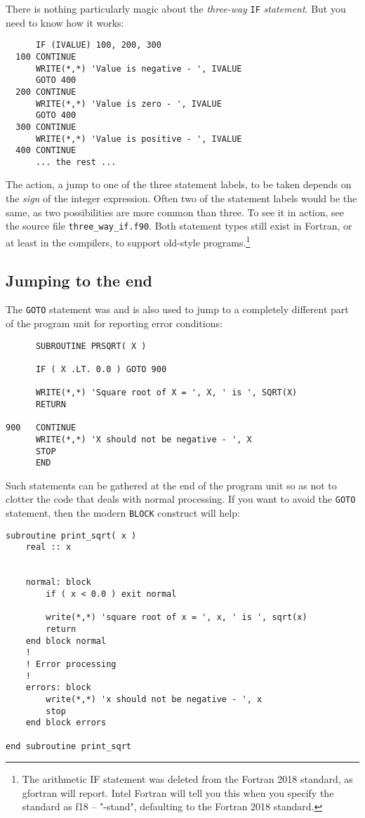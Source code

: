 There is nothing particularly magic about the \emph{three-way} \verb+IF+ \emph{statement}.
But you need to know how it works:
%
\begin{verbatim}
      IF (IVALUE) 100, 200, 300
  100 CONTINUE
      WRITE(*,*) 'Value is negative - ', IVALUE
      GOTO 400
  200 CONTINUE
      WRITE(*,*) 'Value is zero - ', IVALUE
      GOTO 400
  300 CONTINUE
      WRITE(*,*) 'Value is positive - ', IVALUE
  400 CONTINUE
      ... the rest ...
\end{verbatim}
%
The action, a jump to one of the three statement labels, to be taken depends on the
\emph{sign} of the integer expression. Often two of the statement labels would be the same,
as two possibilities are more common than three. To see it in action, see the source
file \verb+three_way_if.f90+. Both statement types still exist in Fortran, or at least
in the compilers, to support old-style programs.\footnote{The arithmetic IF statement
was deleted from the Fortran 2018 standard, as gfortran will report. Intel Fortran
will tell you this when you specify the standard as f18 -- "-stand", defaulting to the
Fortran 2018 standard.}


\subsection{Jumping to the end}
The \verb+GOTO+ statement was and is also used to jump to a completely different
part of the program unit for reporting error conditions:
%
\begin{verbatim}
      SUBROUTINE PRSQRT( X )

      IF ( X .LT. 0.0 ) GOTO 900

      WRITE(*,*) 'Square root of X = ', X, ' is ', SQRT(X)
      RETURN

900   CONTINUE
      WRITE(*,*) 'X should not be negative - ', X
      STOP
      END
\end{verbatim}

Such statements can be gathered at the end of the program unit so as not to clotter
the code that deals with normal processing. If you want to avoid the \verb+GOTO+ statement,
then the modern \verb+BLOCK+ construct will help:
%
\begin{verbatim}
subroutine print_sqrt( x )
    real :: x


    normal: block
        if ( x < 0.0 ) exit normal

        write(*,*) 'square root of x = ', x, ' is ', sqrt(x)
        return
    end block normal
    !
    ! Error processing
    !
    errors: block
        write(*,*) 'x should not be negative - ', x
        stop
    end block errors

end subroutine print_sqrt
\end{verbatim}

